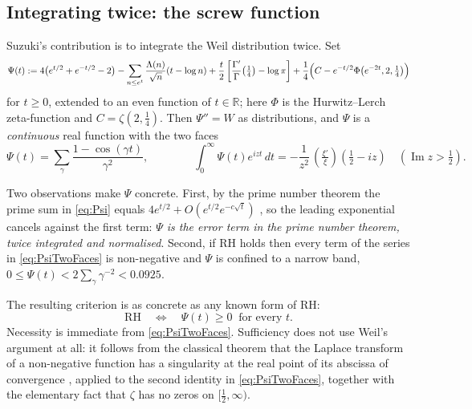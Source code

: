 \documentclass[11pt,reqno]{amsart}
\theoremstyle{plain}
\theoremstyle{definition}
\newcommand{\R}{\mathbb{R}}
\newcommand{\Ip}{\operatorname{Im}}
\newcommand{\lxi}[1]{\left(\tfrac{\xi'}{\xi}\right)\!#1}
\begin{document}
\subsection{Integrating twice: the screw function}

Suzuki's contribution \cite{Suzuki2023} is to integrate the Weil distribution twice. Set
\begin{equation}\label{eq:Psi}
  \Psi(t):=4\bigl(e^{t/2}+e^{-t/2}-2\bigr)
  -\sum_{n\le e^{t}}\frac{\Lambda(n)}{\sqrt n}(t-\log n)
  +\frac t2\left[\frac{\Gamma'}{\Gamma}\!\left(\tfrac14\right)-\log\pi\right]
  +\frac14\Bigl(C-e^{-t/2}\Phi\bigl(e^{-2t},2,\tfrac14\bigr)\Bigr)
\end{equation}
for $t\ge0$, extended to an even function of $t\in\R$; here $\Phi$ is the Hurwitz--Lerch
zeta-function and $C=\zeta(2,\tfrac14)$. Then $\Psi''=W$ as distributions, and $\Psi$ is a
\emph{continuous} real function with the two faces
\begin{equation}\label{eq:PsiTwoFaces}
  \Psi(t)=\sum_\gamma\frac{1-\cos(\gamma t)}{\gamma^{2}},
  \qquad\qquad
  \int_0^\infty \Psi(t)e^{izt}\,dt=-\frac{1}{z^{2}}\,\lxi{\left(\tfrac12-iz\right)}\quad(\Ip z>\tfrac12).
\end{equation}

Two observations make $\Psi$ concrete. First, by the prime number theorem the prime sum in
\eqref{eq:Psi} equals $4e^{t/2}+O(e^{t/2}e^{-c\sqrt t})$ \cite[Prop.~2.1]{Suzuki2023}, so the
leading exponential cancels against the first term: \emph{$\Psi$ is the error term in the prime
number theorem, twice integrated and normalised}. Second, if RH holds then every term of the series
in \eqref{eq:PsiTwoFaces} is non-negative and $\Psi$ is confined to a narrow band,
$0\le\Psi(t)<2\sum_\gamma\gamma^{-2}<0.0925$.

The resulting criterion \cite[Thm.~1.7]{Suzuki2023} is as concrete as any known form of RH:
\begin{equation}\label{eq:pointwise}
  \text{RH}\quad\Longleftrightarrow\quad \Psi(t)\ge0\ \text{ for every }t .
\end{equation}
Necessity is immediate from \eqref{eq:PsiTwoFaces}. Sufficiency does not use Weil's argument at all:
it follows from the classical theorem that the Laplace transform of a non-negative function has a
singularity at the real point of its abscissa of convergence \cite[Ch.~II, Thm.~5b]{Widder}, applied
to the second identity in \eqref{eq:PsiTwoFaces}, together with the elementary fact that
$\zeta$ has no zeros on $[\tfrac12,\infty)$.
\end{document}
